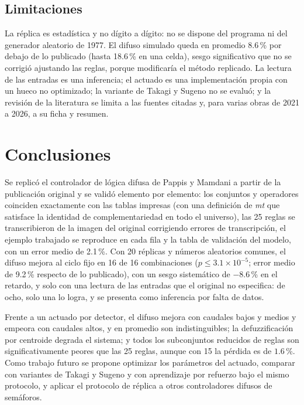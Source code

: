 \documentclass[journal]{IEEEtran}
\begin{document}
\subsection{Limitaciones}
La réplica es estadística y no dígito a dígito: no se dispone del programa ni del generador aleatorio de 1977. El difuso simulado queda en promedio 8.6\,\% por debajo de lo publicado (hasta 18.6\,\% en una celda), sesgo significativo que no se corrigió ajustando las reglas, porque modificaría el método replicado. La lectura de las entradas es una inferencia; el actuado es una implementación propia con un hueco no optimizado; la variante de Takagi y Sugeno no se evaluó; y la revisión de la literatura se limita a las fuentes citadas y, para varias obras de 2021 a 2026, a su ficha y resumen.

\section{Conclusiones}
\label{sec:conclusiones}

Se replicó el controlador de lógica difusa de Pappis y Mamdani a partir de la publicación original y se validó elemento por elemento: los conjuntos y operadores coinciden exactamente con las tablas impresas (con una definición de \emph{mt} que satisface la identidad de complementariedad en todo el universo), las 25 reglas se transcribieron de la imagen del original corrigiendo errores de transcripción, el ejemplo trabajado se reproduce en cada fila y la tabla de validación del modelo, con un error medio de 2.1\,\%. Con 20 réplicas y números aleatorios comunes, el difuso mejora al ciclo fijo en 16 de 16 combinaciones ($p\le3.1\times10^{-5}$; error medio de 9.2\,\% respecto de lo publicado), con un sesgo sistemático de $-8.6$\,\% en el retardo, y solo con una lectura de las entradas que el original no especifica: de ocho, solo una lo logra, y se presenta como inferencia por falta de datos.

Frente a un actuado por detector, el difuso mejora con caudales bajos y medios y empeora con caudales altos, y en promedio son indistinguibles; la defuzzificación por centroide degrada el sistema; y todos los subconjuntos reducidos de reglas son significativamente peores que las 25 reglas, aunque con 15 la pérdida es de $1.6$\,\%. Como trabajo futuro se propone optimizar los parámetros del actuado, comparar con variantes de Takagi y Sugeno y con aprendizaje por refuerzo bajo el mismo protocolo, y aplicar el protocolo de réplica a otros controladores difusos de semáforos.
\end{document}
